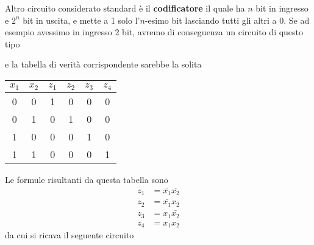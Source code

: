 Altro circuito considerato standard è il \textbf{codificatore} il quale ha $n$ bit in ingresso e
$2^n$ bit in uscita, e mette a 1 solo l'$n$-esimo bit lasciando tutti gli altri a 0. Se ad esempio
avessimo in ingresso 2 bit, avremo di conseguenza un circuito di questo tipo
\begin{center}
\end{center}
e la tabella di verità corrispondente sarebbe la solita
\begin{center}
	\begin{tabular}{c c | c c c c}
		$x_1$ & $x_2$ & $z_1$ & $z_2$ & $z_3$ & $z_4$ \\ \hline
		0     & 0     & 1     & 0     & 0     & 0     \\
		0     & 1     & 0     & 1     & 0     & 0     \\
		1     & 0     & 0     & 0     & 1     & 0     \\
		1     & 1     & 0     & 0     & 0     & 1
	\end{tabular}
\end{center}
Le formule risultanti da questa tabella sono
\begin{align*}
	z_1 & = \bar{x_1} \bar{x_2} \\
	z_2 & = \bar{x_1} x_2       \\
	z_3 & = x_1 \bar{x_2}       \\
	z_4 & = x_1 x_2
\end{align*}
da cui si ricava il seguente circuito
